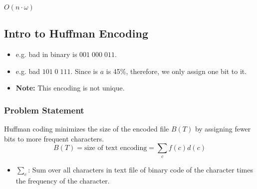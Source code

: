 \begin{definition}
    $O(n\cdot \omega)$
\end{definition}

\subsection{Intro to Huffman Encoding}
\begin{intuition}
    \begin{itemize}
        \item e.g. bad in binary is $001 \; 000 \; 011$.
    \end{itemize}
    \begin{itemize}
        \item e.g. bad $101 \; 0 \; 111$. Since is $a$ is 45\%, therefore, we only assign one bit to it. 
        \item \textbf{Note:} This encoding is not unique. 
    \end{itemize}
\end{intuition}

\subsubsection{Problem Statement}
\begin{definition}
Huffman coding minimizes the size of the encoded file $B(T)$ by assigning fewer bits to more frequent characters.
\begin{equation*}
    B(T) = \text{size of text encoding} = \sum_c f(c)d(c) 
\end{equation*}
\begin{itemize}
    \item $\sum_c$: Sum over all characters in text file of binary code of the character times the frequency of the character.
\end{itemize}
\end{definition}

